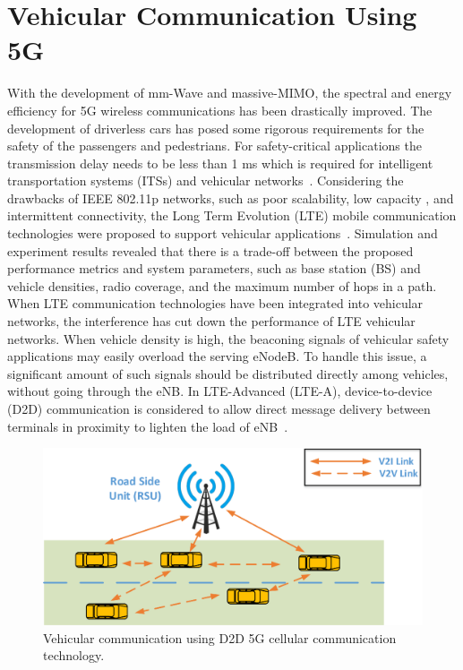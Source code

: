 \section{Vehicular Communication Using 5G}
With the development of mm-Wave and massive-MIMO, the spectral and energy efficiency for 5G wireless communications has been drastically improved. The development of driverless cars has posed some rigorous requirements for the safety of the passengers and pedestrians. For safety-critical applications the transmission delay needs to be less than 1 ms which is required for intelligent transportation systems (ITSs) and vehicular networks~\cite{ge2016vehicular}. Considering the drawbacks of IEEE 802.11p networks, such as poor scalability, low capacity , and intermittent connectivity, the Long Term Evolution (LTE) mobile communication technologies were proposed to support vehicular applications~\cite{araniti2013lte}. Simulation and experiment results revealed that there is a trade-off between the proposed performance metrics and system parameters, such as base station (BS) and vehicle densities, radio coverage, and  the  maximum  number of hops in a path. When LTE communication technologies have been integrated into vehicular networks, the interference has cut down the performance of LTE vehicular networks. When vehicle density is high, the beaconing signals of vehicular safety applications may easily overload the serving eNodeB. To handle this issue, a significant amount of such signals should be distributed directly among vehicles, without  going  through  the  eNB. In  LTE-Advanced (LTE-A), device-to-device (D2D) communication is considered to allow direct message delivery between terminals in proximity to lighten the load of eNB~\cite{mumtaz2014direct}. 

\begin{figure}[!ht]
	\centering
\includegraphics[width=\textwidth,keepaspectratio]{images/Gill/5G/vehiclecomm.eps}
	\caption{Vehicular communication using D2D 5G cellular communication technology.}
	\label{vcomm}
\end{figure}

